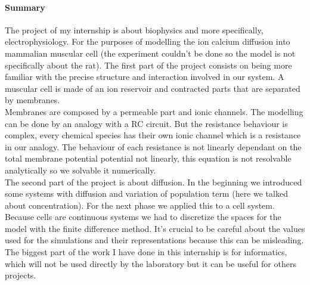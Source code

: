 \documentclass[a4paper,11pt]{report}
\begin{document}
\paragraph{Summary}
The project of my internship is about biophysics and more specifically, electrophysiology. For the purposes of modelling the ion calcium diffusion into mammalian muscular cell (the experiment couldn't be done so the model is not specifically about the rat). The first part of the project consists on being more familiar with the precise structure and interaction involved in our system. A muscular cell is made of an ion reservoir and contracted parts that are separated by membranes. \\
Membranes are composed by a permeable part and ionic channels. The modelling can be done by an analogy with a RC circuit. But the resistance behaviour is complex, every  chemical species has their own ionic channel which is a resistance in our analogy. The behaviour of each resistance is not linearly dependant on the total membrane potential potential not linearly, this equation is not resolvable analytically so we solvable it numerically. \\
The second part of the project is about diffusion. In the beginning we introduced some systems with diffusion and variation of population term (here we talked about concentration). For the next phase we applied this to a cell system. Because cells are continuous systems we had to discretize the spaces for the model with the finite difference method. It's crucial to be careful about the values used for the simulations and their representations because this can be misleading.\\
The biggest part of the work I have done in this internship is for informatics, which will not be used directly by the laboratory but it can be useful for others projects.   
\end{document}
